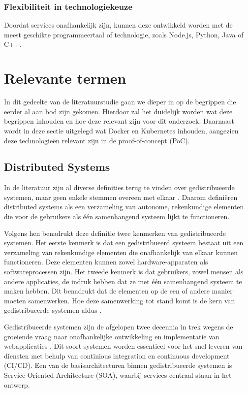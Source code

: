 \subsubsection{Flexibiliteit in technologiekeuze}
\label{sec:flexibiliteit_technologiekeuze}

Doordat services onafhankelijk zijn, kunnen deze ontwikkeld worden met de meest geschikte programmeertaal of technologie, zoals Node.js, Python, Java of C++.

\section{Relevante termen}

In dit gedeelte van de literatuurstudie gaan we dieper in op de begrippen die eerder al aan bod zijn gekomen. Hierdoor zal het duidelijk worden wat deze begrippen inhouden en hoe deze relevant zijn voor dit onderzoek. Daarnaast wordt in deze sectie uitgelegd wat Docker en Kubernetes inhouden, aangezien deze technologieën relevant zijn in de proof-of-concept (PoC).

\subsection{Distributed Systems}
\label{sec:distributed systems}

In de literatuur zijn al diverse definities terug te vinden over gedistribueerde systemen, maar geen enkele stemmen overeen met elkaar \autocite{Steen2018}. Daarom definiëren \textcite{Steen2018} distributed systems als een verzameling van autonome, rekenkundige elementen die voor de gebruikers als één samenhangend systeem lijkt te functioneren.

Volgens hen benadrukt deze definitie twee kenmerken van gedistribueerde systemen. Het eerste kenmerk is dat een gedistribueerd systeem bestaat uit een verzameling van rekenkundige elementen die onafhankelijk van elkaar kunnen functioneren. Deze elementen kunnen zowel hardware-apparaten als softwareprocessen zijn. Het tweede kenmerk is dat gebruikers, zowel mensen als andere applicaties, de indruk hebben dat ze met één samenhangend systeem te maken hebben. Dit benadrukt dat de elementen op de een of andere manier moeten samenwerken. Hoe deze samenwerking tot stand komt is de kern van gedistribueerde systemen aldus \textcite{Steen2018}.

Gedistribueerde systemen zijn de afgelopen twee decennia in trek wegens de groeiende vraag naar onafhankelijke ontwikkeling en implementatie van webapplicaties \autocite{Raj2021}. Dit soort systemen worden essentieel voor het snel leveren van diensten met behulp van continious integration en continuous development (CI/CD). Een van de basisarchitecturen binnen gedistribueerde systemen is Service-Oriented Architecture (SOA), waarbij services centraal staan in het ontwerp.

